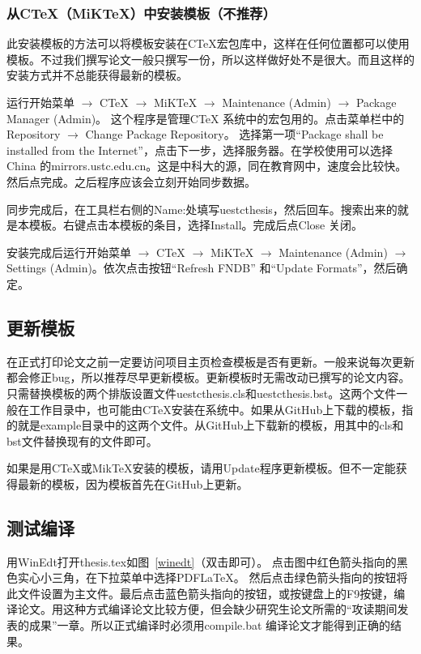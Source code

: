 \subsubsection{从CTeX（MiKTeX）中安装模板（不推荐）}
此安装模板的方法可以将模板安装在CTeX宏包库中，这样在任何位置都可以使用模板。不过我们撰写论文一般只撰写一份，所以这样做好处不是很大。而且这样的安装方式并不总能获得最新的模板。

运行开始菜单 $\longrightarrow$ CTeX $\longrightarrow$ MiKTeX $\longrightarrow$ Maintenance (Admin) $\longrightarrow$ Package Manager (Admin)。 这个程序是管理CTeX 系统中的宏包用的。点击菜单栏中的Repository $\longrightarrow$ Change Package Repository。 选择第一项“Package shall be installed from the Internet”，点击下一步，选择服务器。在学校使用可以选择China 的mirrors.ustc.edu.cn。这是中科大的源，同在教育网中，速度会比较快。然后点完成。之后程序应该会立刻开始同步数据。

同步完成后，在工具栏右侧的Name:处填写uestcthesis，然后回车。搜索出来的就是本模板。右键点击本模板的条目，选择Install。完成后点Close 关闭。

安装完成后运行开始菜单 $\longrightarrow$ CTeX $\longrightarrow$ MiKTeX $\longrightarrow$ Maintenance (Admin) $\longrightarrow$ Settings (Admin)。依次点击按钮“Refresh FNDB” 和“Update Formats”，然后确定。
\subsection{更新模板}
在正式打印论文之前一定要访问项目主页检查模板是否有更新。一般来说每次更新都会修正bug，所以推荐尽早更新模板。更新模板时无需改动已撰写的论文内容。只需替换模板的两个排版设置文件uestcthesis.cls和uestcthesis.bst。这两个文件一般在工作目录中，也可能由CTeX安装在系统中。如果从GitHub上下载的模板，指的就是example目录中的这两个文件。从GitHub上下载新的模板，用其中的cls和bst文件替换现有的文件即可。

如果是用CTeX或MikTeX安装的模板，请用Update程序更新模板。但不一定能获得最新的模板，因为模板首先在GitHub上更新。
\subsection{测试编译}
用WinEdt打开thesis.tex如图~\ref{winedt}（双击即可）。
点击图中红色箭头指向的黑色实心小三角，在下拉菜单中选择PDFLaTeX。 然后点击绿色箭头指向的按钮将此文件设置为主文件。最后点击蓝色箭头指向的按钮，或按键盘上的F9按键，编译论文。用这种方式编译论文比较方便，但会缺少研究生论文所需的“攻读期间发表的成果”一章。所以正式编译时必须用compile.bat 编译论文才能得到正确的结果。

